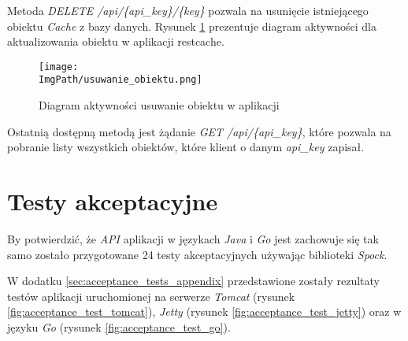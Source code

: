 Metoda \textsl{DELETE /api/\{api\_key\}/\{key\}} pozwala na usunięcie istniejącego obiektu \textsl{Cache} z bazy danych. Rysunek \ref{fig:usuwanie_obiektu} prezentuje diagram aktywności dla aktualizowania obiektu w aplikacji restcache.
\begin{figure}[!ht]
\centering
\texttt{[image: \\ImgPath/usuwanie\_obiektu.png]}
\caption{Diagram aktywności usuwanie obiektu w aplikacji}
\label{fig:usuwanie_obiektu}
\end{figure}

Ostatnią dostępną metodą jest żądanie \textsl{GET /api/\{api\_key\}}, które pozwala na pobranie listy wszystkich obiektów, które klient o danym \textsl{api\_key} zapisał.

\section{Testy akceptacyjne} 

By potwierdzić, że \textsl{API} aplikacji w językach \textsl{Java} i \textsl{Go} jest zachowuje się tak samo zostało przygotowane 24 testy akceptacyjnych używając biblioteki \textsl{Spock}. 

W dodatku \ref{sec:acceptance_tests_appendix} przedstawione zostały rezultaty testów aplikacji uruchomionej na serwerze \textsl{Tomcat} (rysunek \ref{fig:acceptance_test_tomcat}), \textsl{Jetty} (rysunek \ref{fig:acceptance_test_jetty}) oraz w języku \textsl{Go} (rysunek \ref{fig:acceptance_test_go}).

